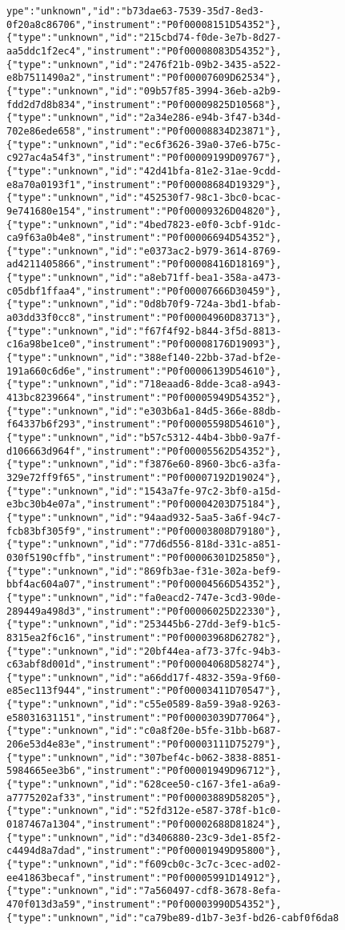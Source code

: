 \begin{verbatim}
ype":"unknown","id":"b73dae63-7539-35d7-8ed3-0f20a8c86706","instrument":"P0f00008151D54352"},{"type":"unknown","id":"215cbd74-f0de-3e7b-8d27-aa5ddc1f2ec4","instrument":"P0f00008083D54352"},{"type":"unknown","id":"2476f21b-09b2-3435-a522-e8b7511490a2","instrument":"P0f00007609D62534"},{"type":"unknown","id":"09b57f85-3994-36eb-a2b9-fdd2d7d8b834","instrument":"P0f00009825D10568"},{"type":"unknown","id":"2a34e286-e94b-3f47-b34d-702e86ede658","instrument":"P0f00008834D23871"},{"type":"unknown","id":"ec6f3626-39a0-37e6-b75c-c927ac4a54f3","instrument":"P0f00009199D09767"},{"type":"unknown","id":"42d41bfa-81e2-31ae-9cdd-e8a70a0193f1","instrument":"P0f00008684D19329"},{"type":"unknown","id":"452530f7-98c1-3bc0-bcac-9e741680e154","instrument":"P0f00009326D04820"},{"type":"unknown","id":"4bed7823-e0f0-3cbf-91dc-ca9f63a0b4e8","instrument":"P0f00006694D54352"},{"type":"unknown","id":"e0373ac2-b979-3614-8769-ad4211405866","instrument":"P0f00008416D18169"},{"type":"unknown","id":"a8eb71ff-bea1-358a-a473-c05dbf1ffaa4","instrument":"P0f00007666D30459"},{"type":"unknown","id":"0d8b70f9-724a-3bd1-bfab-a03dd33f0cc8","instrument":"P0f00004960D83713"},{"type":"unknown","id":"f67f4f92-b844-3f5d-8813-c16a98be1ce0","instrument":"P0f00008176D19093"},{"type":"unknown","id":"388ef140-22bb-37ad-bf2e-191a660c6d6e","instrument":"P0f00006139D54610"},{"type":"unknown","id":"718eaad6-8dde-3ca8-a943-413bc8239664","instrument":"P0f00005949D54352"},{"type":"unknown","id":"e303b6a1-84d5-366e-88db-f64337b6f293","instrument":"P0f00005598D54610"},{"type":"unknown","id":"b57c5312-44b4-3bb0-9a7f-d106663d964f","instrument":"P0f00005562D54352"},{"type":"unknown","id":"f3876e60-8960-3bc6-a3fa-329e72ff9f65","instrument":"P0f00007192D19024"},{"type":"unknown","id":"1543a7fe-97c2-3bf0-a15d-e3bc30b4e07a","instrument":"P0f00004203D75184"},{"type":"unknown","id":"94aad932-5aa5-3a6f-94c7-fcb83bf305f9","instrument":"P0f00003808D79180"},{"type":"unknown","id":"77d6d556-818d-331c-a851-030f5190cffb","instrument":"P0f00006301D25850"},{"type":"unknown","id":"869fb3ae-f31e-302a-bef9-bbf4ac604a07","instrument":"P0f00004566D54352"},{"type":"unknown","id":"fa0eacd2-747e-3cd3-90de-289449a498d3","instrument":"P0f00006025D22330"},{"type":"unknown","id":"253445b6-27dd-3ef9-b1c5-8315ea2f6c16","instrument":"P0f00003968D62782"},{"type":"unknown","id":"20bf44ea-af73-37fc-94b3-c63abf8d001d","instrument":"P0f00004068D58274"},{"type":"unknown","id":"a66dd17f-4832-359a-9f60-e85ec113f944","instrument":"P0f00003411D70547"},{"type":"unknown","id":"c55e0589-8a59-39a8-9263-e58031631151","instrument":"P0f00003039D77064"},{"type":"unknown","id":"c0a8f20e-b5fe-31bb-b687-206e53d4e83e","instrument":"P0f00003111D75279"},{"type":"unknown","id":"307bef4c-b062-3838-8851-5984665ee3b6","instrument":"P0f00001949D96712"},{"type":"unknown","id":"628cee50-c167-3fe1-a6a9-a7775202af33","instrument":"P0f00003889D58205"},{"type":"unknown","id":"52fd312e-e587-378f-b1c0-0187467a1304","instrument":"P0f00002688D81824"},{"type":"unknown","id":"d3406880-23c9-3de1-85f2-c4494d8a7dad","instrument":"P0f00001949D95800"},{"type":"unknown","id":"f609cb0c-3c7c-3cec-ad02-ee41863becaf","instrument":"P0f00005991D14912"},{"type":"unknown","id":"7a560497-cdf8-3678-8efa-470f013d3a59","instrument":"P0f00003990D54352"},{"type":"unknown","id":"ca79be89-d1b7-3e3f-bd26-cabf0f6da8
\end{verbatim}
